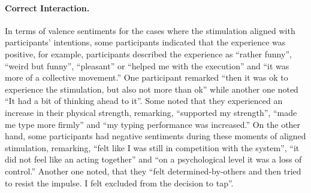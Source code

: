 \paragraph{Correct Interaction.} 
In terms of valence sentiments for the cases where the stimulation aligned with participants' intentions, some participants indicated that the experience was positive, for example, participants described the experience as ``rather funny'', ``weird but funny'', ``pleasant'' or ``helped me with the execution'' and ``it was more of a collective movement.'' One participant remarked ``then it was ok to experience the stimulation, but also not more than ok'' while another one noted ``It had a bit of thinking ahead to it''. Some noted that they experienced an increase in their physical strength, remarking, ``supported my strength'', ``made me type more firmly'' and ``my typing performance was increased.'' On the other hand, some participants had negative sentiments during these moments of aligned stimulation, remarking, ``felt like I was still in competition with the system'', ``it did not feel like an acting together'' and ``on a psychological level it was a loss of control.'' Another one noted, that they ``felt determined-by-others and then tried to resist the impulse. I felt excluded from the decision to tap''.













